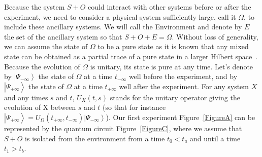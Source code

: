 \documentclass[11pt,amsmath,amssymb,latexsym,a4paper]{article}
\newcommand{\ket}[1]{\left|{#1}\right>}
\begin{document}
Because the system $S+O$ could interact with other systems before or after the experiment, we need to consider a physical system sufficiently large, call it $\Omega$, to include these ancillary systems. We will call the Environment and denote by $E$ the set of the ancillary system so that $S+O+E =\Omega$. Without loss of generality, we can assume the state of $\Omega$ to be a pure state as it is known that any mixed state can be obtained as a partial trace of a pure state in a larger Hilbert space~\cite{Bergou}. Because the evolution of $\Omega$ is unitary, its state is pure at any time. Let's denote by $\ket{\Psi_{-\infty}}$ the state of $\Omega$ at a time $t_{-\infty}$ well before the experiment, and by $\ket{\Psi_{+\infty}}$ the state of $\Omega$ at a time $t_{+\infty}$ well after the experiment. 
For any system $X$ and any times $s$ and $t$, $U_X(t, s)$ stands for the unitary operator giving the evolution of X between $s$ and $t$ (so that for instance $\ket{\Psi_{+\infty}} = U_\Omega(t_{+\infty}, t_{-\infty}) \ket{\Psi_{-\infty}}$). Our first experiment Figure~\ref{FigureA} can be represented by the quantum circuit Figure~\ref{FigureC}, where we assume that $S+O$ is isolated from the environment from a time $t_0 < t_a$ and until a time $t_1 > t_b$.
\end{document}

